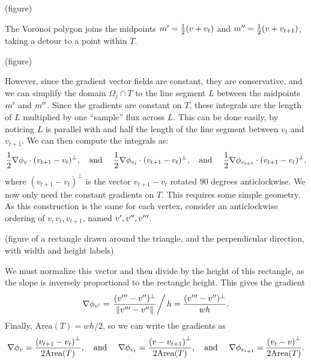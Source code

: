 \vskip 0.2in
(figure)
\vskip 0.2in

The Voronoi polygon joins the midpoints $m^{\prime} = \frac{1}{2}(v + v_t)$ and $m^{\prime\prime} = \frac{1}{2}(v + v_{t+1})$, taking a detour to a point within $T$.

\vskip 0.2in
(figure)
\vskip 0.2in

However, since the gradient vector fields are constant, they are conservative, and we can simplify the domain $\Omega_j \cap T$ to the line segment $L$ between
the midpoints $m^{\prime}$ and $m^{\prime\prime}$. Since the gradients are constant on $T$, these integrals are the length of $L$ multiplied by one ``sample'' flux across $L$.
This can be done easily, by noticing $L$ is parallel with and half the length of the line segment between $v_t$ and $v_{t+1}$.
We can then compute the integrals as:
\begin{equation}\label{fvm_integrals_closed}
    \frac{1}{2}\nabla\phi_v\cdot(v_{t+1} - v_t)^\perp,\text{\quad and \quad}
    \frac{1}{2}\nabla\phi_{v_t}\cdot(v_{t+1} - v_t)^\perp,\text{\quad and \quad}
    \frac{1}{2}\nabla\phi_{v_{t+1}}\cdot(v_{t+1} - v_t)^\perp,
\end{equation}
where $(v_{t+1} - v_t)^\perp$ is the vector $v_{t+1} - v_t$ rotated $90$ degrees anticlockwise.
We now only need the constant gradients on $T$. This requires some simple geometry. As this construction is the same for each vertex, consider an anticlockwise ordering of $v,v_t,v_{t+1}$, named $v^{\prime},v^{\prime\prime},v^{\prime\prime\prime}$.

\vskip 0.2in
(figure of a rectangle drawn around the triangle, and the perpendicular direction, with width and height labels)
\vskip 0.2in

We must normalize this vector and then divide by the height of this rectangle, as the slope is inversely proportional to the rectangle height.
This gives the gradient
$$
    \nabla\phi_{v^{\prime}} = \left.\frac{(v^{\prime\prime\prime} - v^{\prime\prime})^\perp}{\norm{v^{\prime\prime\prime} - v^{\prime\prime}}}\right/h = \frac{(v^{\prime\prime\prime} - v^{\prime\prime})^\perp}{wh}.
$$
Finally, $\text{Area}(T) = wh/2$, so we can write the gradients as
\begin{equation}\label{fvm_gradients}
    \nabla\phi_v = \frac{\left(v_{t+1} - v_t\right)^\perp}{2\text{Area}(T)},\text{\quad and \quad}
    \nabla\phi_{v_t} = \frac{\left(v - v_{t+1}\right)^\perp}{2\text{Area}(T)},\text{\quad and \quad}
    \nabla\phi_{v_{t+1}} = \frac{\left(v_t - v\right)^\perp}{2\text{Area}(T)}.
\end{equation}

